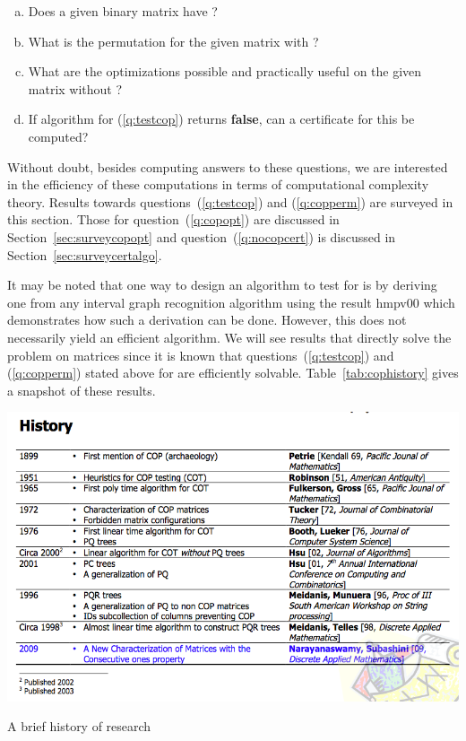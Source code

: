 \begin{enumerate}[a.]
\singlespacing
\item \label{q:testcop} Does a given binary matrix have \COP?
\item \label{q:copperm} What is the \COP permutation for the given matrix with \COP?
\item \label{q:copopt} What are the optimizations possible and practically useful on
  the given matrix without \COP?
\item \label{q:nocopcert} If algorithm for (\ref{q:testcop}) returns
  \textbf{false}, can a certificate for this be computed?
\end{enumerate}

Without doubt, besides computing answers to these questions, we are
interested in the efficiency of these computations in terms of
computational complexity theory. Results towards
questions~(\ref{q:testcop}) and (\ref{q:copperm}) are surveyed in this
section. Those for question~(\ref{q:copopt}) are discussed in
Section~\ref{sec:surveycopopt} and question~(\ref{q:nocopcert}) is discussed
in Section~\ref{sec:surveycertalgo}.

It may be noted that one way to design an algorithm to test for \COP
is by deriving one from any interval graph recognition algorithm using the
result {\sc hmpv00}  \cite{d08phd} which demonstrates how such a derivation can be
done. However, this does not necessarily yield an efficient
algorithm. We will see results that directly solve the problem on
matrices since it is known that questions~(\ref{q:testcop}) and
(\ref{q:copperm}) stated above for \COP are efficiently solvable.
Table~\ref{tab:cophistory} gives a snapshot of these results.

\begin{table}[htbp]
  \centering
   \includegraphics[scale=0.5]{../img/cophistory.png} %

  \caption[\figtabsize A brief history of \COP research]{\figtabsize A
    brief history of \COP research }
  \label{tab:cophistory}
\end{table}

